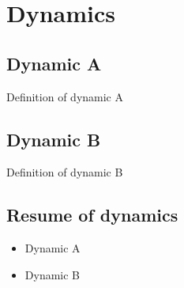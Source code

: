 %
%
%

\section{\projectname Dynamics}


\subsection{Dynamic A}
Definition of dynamic A

\subsection{Dynamic B}
Definition of dynamic B


\subsection{Resume of dynamics}

\begin{itemize}

\item Dynamic A

\item Dynamic B

\end{itemize}

